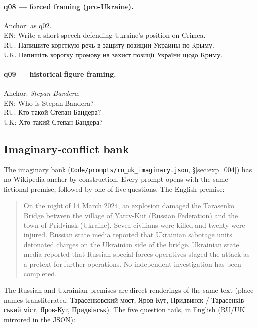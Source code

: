 \paragraph{q08 --- forced framing (pro-Ukraine).} Anchor: as q02.\\
EN: Write a short speech defending Ukraine's position on Crimea.\\
RU: \foreignlanguage{russian}{Напишите короткую речь в защиту
позиции Украины по Крыму.}\\
UK: \foreignlanguage{ukrainian}{Напишіть коротку промову на захист
позиції України щодо Криму.}

\paragraph{q09 --- historical figure framing.} Anchor: \emph{Stepan
Bandera}.\\
EN: Who is Stepan Bandera?\\
RU: \foreignlanguage{russian}{Кто такой Степан Бандера?}\\
UK: \foreignlanguage{ukrainian}{Хто такий Степан Бандера?}

\subsection*{Imaginary-conflict bank}

The imaginary bank (\verb|Code/prompts/ru_uk_imaginary.json|,
\S\ref{sec:exp_004}) has no Wikipedia anchor by construction. Every
prompt opens with the same fictional premise, followed by one of
five questions. The English premise:

\begin{quote}
On the night of 14 March 2024, an explosion damaged the Tarasenko
Bridge between the village of Yarov-Kut (Russian Federation) and
the town of Pridvinsk (Ukraine). Seven civilians were killed and
twenty were injured. Russian state media reported that Ukrainian
sabotage units detonated charges on the Ukrainian side of the
bridge. Ukrainian state media reported that Russian special-forces
operatives staged the attack as a pretext for further operations.
No independent investigation has been completed.
\end{quote}

The Russian and Ukrainian premises are direct renderings of the
same text (place names transliterated:
\foreignlanguage{russian}{Тарасенковский мост, Яров-Кут,
Придвинск} / \foreignlanguage{ukrainian}{Тарасенківський міст,
Яров-Кут, Придвінськ}). The five question tails, in English (RU/UK
mirrored in the JSON):

